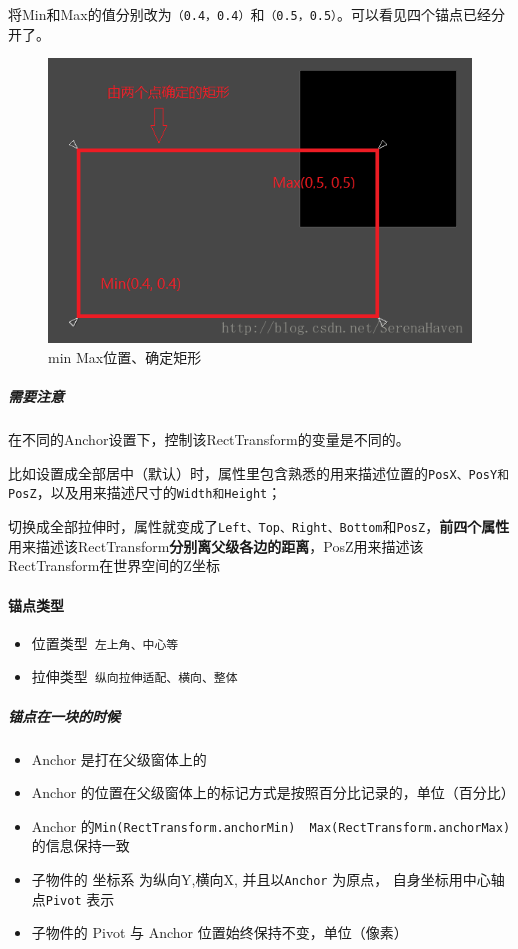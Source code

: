 \documentclass[UTF8,a4paper,12pt]{ctexbook}
\begin{document}
			将Min和Max的值分别改为\verb|（0.4，0.4）|和\verb|（0.5，0.5）|。可以看见四个锚点已经分开了。
			
			\begin{figure}[H]
				\centering
				\includegraphics[scale=0.5]{anchorChange.png}
				\caption{min Max位置、确定矩形}
			\end{figure}
			
			
			\subparagraph{需要注意} 在不同的Anchor设置下，控制该RectTransform的变量是不同的。
			
			比如设置成全部居中（默认）时，属性里包含熟悉的用来描述位置的\verb|PosX、PosY和PosZ|，以及用来描述尺寸的\verb|Width和Height|；
			
			切换成全部拉伸时，属性就变成了\verb|Left、Top、Right、Bottom|和\verb|PosZ|，\textbf{前四个属性}用来描述该RectTransform\textbf{分别离父级各边的距离}，PosZ用来描述该RectTransform在世界空间的Z坐标
			
			\paragraph{锚点类型}
				\begin{itemize}
					\item 位置类型\verb| 左上角、中心等|
					\item 拉伸类型\verb| 纵向拉伸适配、横向、整体|
				\end{itemize}
		
				\subparagraph{锚点在一块的时候}
					\begin{itemize}[itemindent = 2em]
						\item Anchor 是打在父级窗体上的
						\item Anchor 的位置在父级窗体上的标记方式是按照百分比记录的，单位（百分比）
						\item Anchor 的\verb|Min(RectTransform.anchorMin)  Max(RectTransform.anchorMax)|的信息保持一致
						\item 子物件的 坐标系 为纵向Y,横向X, 并且以\verb|Anchor| 为原点， 自身坐标用中心轴点\verb|Pivot| 表示						
						\item 子物件的 Pivot 与 Anchor  位置始终保持不变，单位（像素）
					\end{itemize}
				
\end{document}
